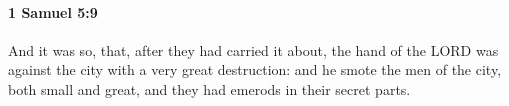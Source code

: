 
		\paragraph{1 Samuel 5:9} %
			\label{1SAMUEL-5-9}

			And it was so, that, after they had carried it about, the hand of the LORD was against the city with a very great destruction: and he smote the men of the city, both small and great, and they had emerods in their secret parts.


